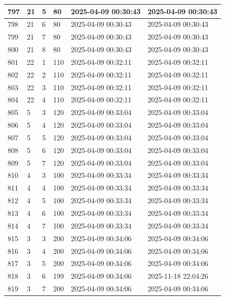 \begin{longtable}{|l|l|l|l|l|l|}
797 & 21 & 5 & 80 & 2025-04-09 00:30:43 & 2025-04-09 00:30:43 \\ \hline 
798 & 21 & 6 & 80 & 2025-04-09 00:30:43 & 2025-04-09 00:30:43 \\ \hline 
799 & 21 & 7 & 80 & 2025-04-09 00:30:43 & 2025-04-09 00:30:43 \\ \hline 
800 & 21 & 8 & 80 & 2025-04-09 00:30:43 & 2025-04-09 00:30:43 \\ \hline 
801 & 22 & 1 & 110 & 2025-04-09 00:32:11 & 2025-04-09 00:32:11 \\ \hline 
802 & 22 & 2 & 110 & 2025-04-09 00:32:11 & 2025-04-09 00:32:11 \\ \hline 
803 & 22 & 3 & 110 & 2025-04-09 00:32:11 & 2025-04-09 00:32:11 \\ \hline 
804 & 22 & 4 & 110 & 2025-04-09 00:32:11 & 2025-04-09 00:32:11 \\ \hline 
805 & 5 & 3 & 120 & 2025-04-09 00:33:04 & 2025-04-09 00:33:04 \\ \hline 
806 & 5 & 4 & 120 & 2025-04-09 00:33:04 & 2025-04-09 00:33:04 \\ \hline 
807 & 5 & 5 & 120 & 2025-04-09 00:33:04 & 2025-04-09 00:33:04 \\ \hline 
808 & 5 & 6 & 120 & 2025-04-09 00:33:04 & 2025-04-09 00:33:04 \\ \hline 
809 & 5 & 7 & 120 & 2025-04-09 00:33:04 & 2025-04-09 00:33:04 \\ \hline 
810 & 4 & 3 & 100 & 2025-04-09 00:33:34 & 2025-04-09 00:33:34 \\ \hline 
811 & 4 & 4 & 100 & 2025-04-09 00:33:34 & 2025-04-09 00:33:34 \\ \hline 
812 & 4 & 5 & 100 & 2025-04-09 00:33:34 & 2025-04-09 00:33:34 \\ \hline 
813 & 4 & 6 & 100 & 2025-04-09 00:33:34 & 2025-04-09 00:33:34 \\ \hline 
814 & 4 & 7 & 100 & 2025-04-09 00:33:34 & 2025-04-09 00:33:34 \\ \hline 
815 & 3 & 3 & 200 & 2025-04-09 00:34:06 & 2025-04-09 00:34:06 \\ \hline 
816 & 3 & 4 & 200 & 2025-04-09 00:34:06 & 2025-04-09 00:34:06 \\ \hline 
817 & 3 & 5 & 200 & 2025-04-09 00:34:06 & 2025-04-09 00:34:06 \\ \hline 
818 & 3 & 6 & 199 & 2025-04-09 00:34:06 & 2025-11-18 22:04:26 \\ \hline 
819 & 3 & 7 & 200 & 2025-04-09 00:34:06 & 2025-04-09 00:34:06 \\ \hline 
 \end{longtable}

